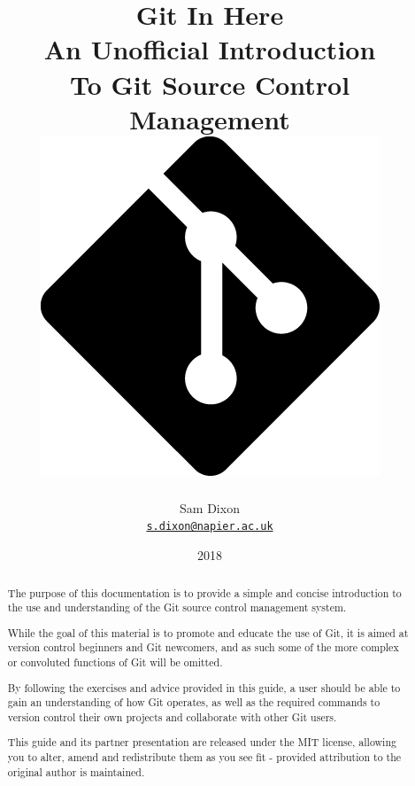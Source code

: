 \documentclass[11pt, a4paper, titlepage]{article}
\begin{document}
\title{ 
    \LARGE Git In Here\\
    \Large An Unofficial Introduction\\
    To Git Source Control Management\\
    \bigbreak
    \includegraphics[scale=0.4]{../res/git_icon}}


\author{Sam Dixon\\
\texttt{\href{mailto:s.dixon@napier.ac.uk}{s.dixon@napier.ac.uk}}
}

\date{2018} 
\maketitle



\begin{abstract} The purpose of this documentation is to provide a simple and
concise introduction to the use and understanding of the Git source control
management system.

While the goal of this material is to promote and educate the use of Git, it
is aimed at version control beginners and Git newcomers, and as such some of
the more complex or convoluted functions of Git will be omitted.

By following the exercises and advice provided in this guide, a user should be
able to gain an understanding of how Git operates, as well as the required
commands to version control their own projects and collaborate with other Git
users.

This guide and its partner presentation are released under the MIT license,
allowing you to alter, amend and redistribute them as you see fit - provided
attribution to the original author is maintained. 
\end{abstract}
\end{document}
